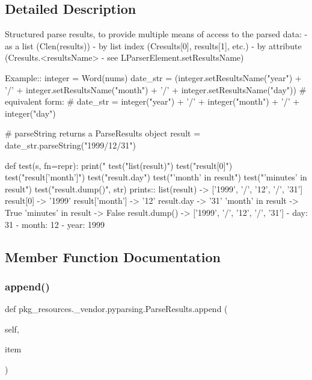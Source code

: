 \subsection{Detailed Description}
\begin{DoxyVerb}Structured parse results, to provide multiple means of access to the parsed data:
   - as a list (C{len(results)})
   - by list index (C{results[0], results[1]}, etc.)
   - by attribute (C{results.<resultsName>} - see L{ParserElement.setResultsName})

Example::
    integer = Word(nums)
    date_str = (integer.setResultsName("year") + '/' 
                    + integer.setResultsName("month") + '/' 
                    + integer.setResultsName("day"))
    # equivalent form:
    # date_str = integer("year") + '/' + integer("month") + '/' + integer("day")

    # parseString returns a ParseResults object
    result = date_str.parseString("1999/12/31")

    def test(s, fn=repr):
        print("%
    test("list(result)")
    test("result[0]")
    test("result['month']")
    test("result.day")
    test("'month' in result")
    test("'minutes' in result")
    test("result.dump()", str)
prints::
    list(result) -> ['1999', '/', '12', '/', '31']
    result[0] -> '1999'
    result['month'] -> '12'
    result.day -> '31'
    'month' in result -> True
    'minutes' in result -> False
    result.dump() -> ['1999', '/', '12', '/', '31']
    - day: 31
    - month: 12
    - year: 1999
\end{DoxyVerb}
 

\subsection{Member Function Documentation}
\mbox{\label{classpkg__resources_1_1__vendor_1_1pyparsing_1_1_parse_results_a45a5ff7aa33f1c393c793f2751036531}} 
\subsubsection{\texorpdfstring{append()}{append()}}
{\footnotesize\ttfamily def pkg\+\_\+resources.\+\_\+vendor.\+pyparsing.\+Parse\+Results.\+append (\begin{DoxyParamCaption}\item[{}]{self,  }\item[{}]{item }\end{DoxyParamCaption})}

